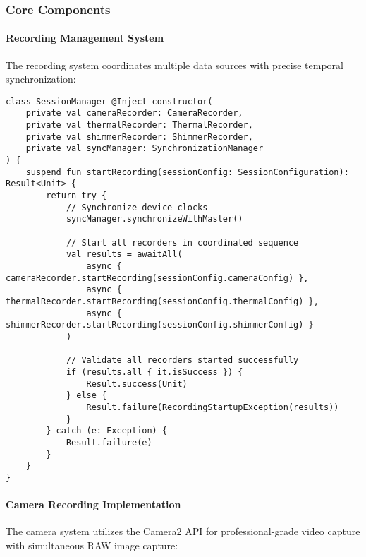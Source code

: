 \documentclass[12pt,a4paper]{article}
\begin{document}
\subsubsection{Core Components}

\paragraph{Recording Management System}

The recording system coordinates multiple data sources with precise temporal synchronization:

\begin{verbatim}
class SessionManager @Inject constructor(
    private val cameraRecorder: CameraRecorder,
    private val thermalRecorder: ThermalRecorder,
    private val shimmerRecorder: ShimmerRecorder,
    private val syncManager: SynchronizationManager
) {
    suspend fun startRecording(sessionConfig: SessionConfiguration): Result<Unit> {
        return try {
            // Synchronize device clocks
            syncManager.synchronizeWithMaster()

            // Start all recorders in coordinated sequence
            val results = awaitAll(
                async { cameraRecorder.startRecording(sessionConfig.cameraConfig) },
                async { thermalRecorder.startRecording(sessionConfig.thermalConfig) },
                async { shimmerRecorder.startRecording(sessionConfig.shimmerConfig) }
            )

            // Validate all recorders started successfully
            if (results.all { it.isSuccess }) {
                Result.success(Unit)
            } else {
                Result.failure(RecordingStartupException(results))
            }
        } catch (e: Exception) {
            Result.failure(e)
        }
    }
}
\end{verbatim}

\paragraph{Camera Recording Implementation}

The camera system utilizes the Camera2 API for professional-grade video capture with simultaneous RAW image capture:
\end{document}
